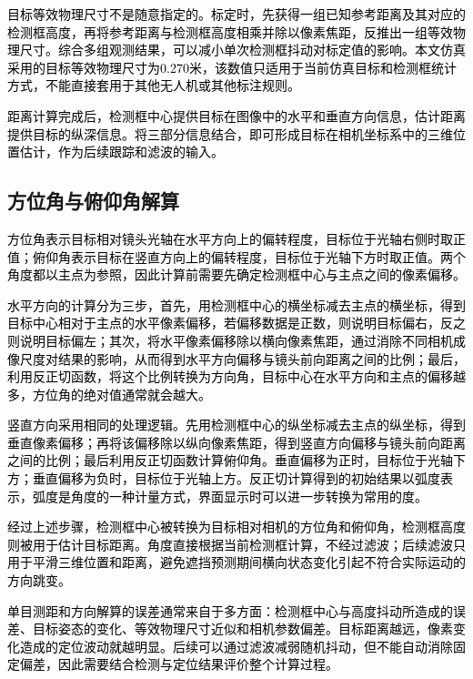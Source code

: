\textcolor{black}{目标等效物理尺寸不是随意指定的。标定时，先获得一组已知参考距离及其对应的检测框高度，再将参考距离与检测框高度相乘并除以像素焦距，反推出一组等效物理尺寸。综合多组观测结果，可以减小单次检测框抖动对标定值的影响。本文仿真采用的目标等效物理尺寸为0.270米，该数值只适用于当前仿真目标和检测框统计方式，不能直接套用于其他无人机或其他标注规则。}

\textcolor{black}{距离计算完成后，检测框中心提供目标在图像中的水平和垂直方向信息，估计距离提供目标的纵深信息。将三部分信息结合，即可形成目标在相机坐标系中的三维位置估计，作为后续跟踪和滤波的输入。}

\subsection{方位角与俯仰角解算}

\textcolor{black}{方位角表示目标相对镜头光轴在水平方向上的偏转程度，目标位于光轴右侧时取正值；俯仰角表示目标在竖直方向上的偏转程度，目标位于光轴下方时取正值。两个角度都以主点为参照，因此计算前需要先确定检测框中心与主点之间的像素偏移。}

\textcolor{black}{水平方向的计算分为三步，首先，用检测框中心的横坐标减去主点的横坐标，得到目标中心相对于主点的水平像素偏移，若偏移数据是正数，则说明目标偏右，反之则说明目标偏左；其次，将水平像素偏移除以横向像素焦距，通过消除不同相机成像尺度对结果的影响，从而得到水平方向偏移与镜头前向距离之间的比例；最后，利用反正切函数，将这个比例转换为方向角，目标中心在水平方向和主点的偏移越多，方位角的绝对值通常就会越大。}

\textcolor{black}{竖直方向采用相同的处理逻辑。先用检测框中心的纵坐标减去主点的纵坐标，得到垂直像素偏移；再将该偏移除以纵向像素焦距，得到竖直方向偏移与镜头前向距离之间的比例；最后利用反正切函数计算俯仰角。垂直偏移为正时，目标位于光轴下方；垂直偏移为负时，目标位于光轴上方。反正切计算得到的初始结果以弧度表示，弧度是角度的一种计量方式，界面显示时可以进一步转换为常用的度。}

\textcolor{black}{经过上述步骤，检测框中心被转换为目标相对相机的方位角和俯仰角，检测框高度则被用于估计目标距离。角度直接根据当前检测框计算，不经过滤波；后续滤波只用于平滑三维位置和距离，避免遮挡预测期间横向状态变化引起不符合实际运动的方向跳变。}

\textcolor{black}{单目测距和方向解算的误差通常来自于多方面：检测框中心与高度抖动所造成的误差、目标姿态的变化、等效物理尺寸近似和相机参数偏差。目标距离越远，像素变化造成的定位波动就越明显。后续可以通过滤波减弱随机抖动，但不能自动消除固定偏差，因此需要结合检测与定位结果评价整个计算过程。}

